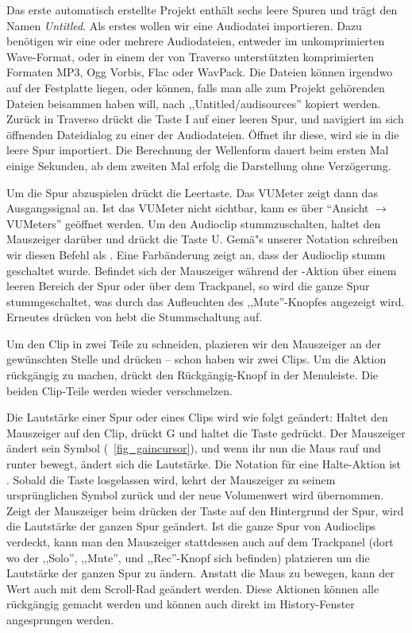 Das erste automatisch erstellte Projekt enthält sechs leere Spuren und trägt den Namen \emph{Untitled}. Als erstes wollen wir eine Audiodatei importieren. Dazu benötigen wir eine oder mehrere Audiodateien, entweder im unkomprimierten Wave-Format, oder in einem der von Traverso unterstützten komprimierten Formaten MP3, Ogg Vorbis, Flac oder WavPack. Die Dateien können irgendwo auf der Festplatte liegen, oder können, falls man alle zum Projekt gehörenden Dateien beisammen haben will, nach ,,Untitled/audisources'' kopiert werden. Zurück in Traverso drückt die Taste I auf einer leeren Spur, und navigiert im sich öffnenden Dateidialog zu einer der Audiodateien. Öffnet ihr diese, wird sie in die leere Spur importiert. Die Berechnung der Wellenform dauert beim ersten Mal einige Sekunden, ab dem zweiten Mal erfolg die Darstellung ohne Verzögerung.

Um die Spur abzuspielen drückt die Leertaste. Das VUMeter zeigt dann das Ausgangssignal an. Ist das VUMeter nicht sichtbar, kann es über ``Ansicht $\rightarrow$ VUMeters'' geöffnet werden. Um den Audioclip stummzuschalten, haltet den Mauszeiger darüber und drückt die Taste U. Gemä"s unserer Notation schreiben wir diesen Befehl als . Eine Farbänderung zeigt an, dass der Audioclip stumm geschaltet wurde. Befindet sich der Mauszeiger während der -Aktion über einem leeren Bereich der Spur oder über dem Trackpanel, so wird die ganze Spur stummgeschaltet, was durch das Aufleuchten des ,,Mute''-Knopfes angezeigt wird. Erneutes drücken von  hebt die Stummschaltung auf.

Um den Clip in zwei Teile zu schneiden, plazieren wir den Mauszeiger an der gewünschten Stelle und drücken  -- schon haben wir zwei Clips. Um die Aktion rückgängig zu machen, drückt den Rückgängig-Knopf in der Menuleiste. Die beiden Clip-Teile werden wieder verschmelzen.

Die Lautstärke einer Spur oder eines Clips wird wie folgt geändert: Haltet den Mauszeiger auf den Clip, drückt G und haltet die Taste gedrückt. Der Mauszeiger ändert sein Symbol (\FigB\ \ref{fig_gaincursor}), und wenn ihr nun die Maus rauf und runter bewegt, ändert sich die Lautstärke. Die Notation für eine Halte-Aktion ist . Sobald die Taste losgelassen wird, kehrt der Mauszeiger zu seinem ursprünglichen Symbol zurück und der neue Volumenwert wird übernommen. Zeigt der Mauszeiger beim drücken der Taste auf den Hintergrund der Spur, wird die Lautstärke der ganzen Spur geändert. Ist die ganze Spur von Audioclips verdeckt, kann man den Mauszeiger stattdessen auch auf dem Trackpanel (dort wo der ,,Solo'', ,,Mute'', und ,,Rec''-Knopf sich befinden) platzieren um die Lautstärke der ganzen Spur zu ändern. Anstatt die Maus zu bewegen, kann der Wert auch mit dem Scroll-Rad geändert werden. Diese Aktionen können alle rückgängig gemacht werden und können auch direkt im History-Fenster angesprungen werden.

